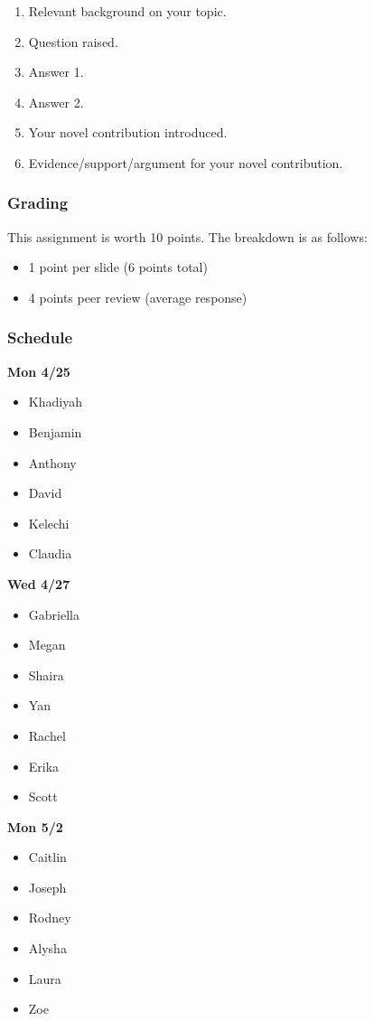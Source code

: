 \documentclass[]{article}
\providecommand{\tightlist}{%
  \setlength{\itemsep}{0pt}\setlength{\parskip}{0pt}}
\begin{document}
\begin{enumerate}
\def\labelenumi{\arabic{enumi}.}
\tightlist
\item
  Relevant background on your topic.
\item
  Question raised.
\item
  Answer 1.
\item
  Answer 2.
\item
  Your novel contribution introduced.
\item
  Evidence/support/argument for your novel contribution.
\end{enumerate}

\subsubsection{Grading}\label{grading}

This assignment is worth 10 points. The breakdown is as follows:

\begin{itemize}
\tightlist
\item
  1 point per slide (6 points total)
\item
  4 points peer review (average response)
\end{itemize}

\subsubsection{Schedule}\label{schedule}

\textbf{Mon 4/25}

\begin{itemize}
\tightlist
\item
  Khadiyah
\item
  Benjamin
\item
  Anthony
\item
  David
\item
  Kelechi
\item
  Claudia
\end{itemize}

\textbf{Wed 4/27}

\begin{itemize}
\tightlist
\item
  Gabriella
\item
  Megan
\item
  Shaira
\item
  Yan
\item
  Rachel
\item
  Erika
\item
  Scott
\end{itemize}

\textbf{Mon 5/2}

\begin{itemize}
\tightlist
\item
  Caitlin
\item
  Joseph
\item
  Rodney
\item
  Alysha
\item
  Laura
\item
  Zoe
\end{itemize}
\end{document}
